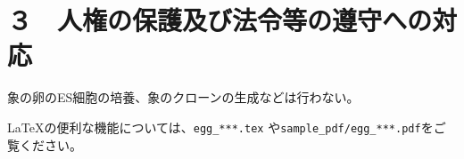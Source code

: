 
\section{３　人権の保護及び法令等の遵守への対応}

	象の卵のES細胞の培養、象のクローンの生成などは行わない。

	\LaTeX の便利な機能については、\texttt{egg\_***.tex} や\texttt{sample\_pdf/egg\_***.pdf}をご覧ください。



